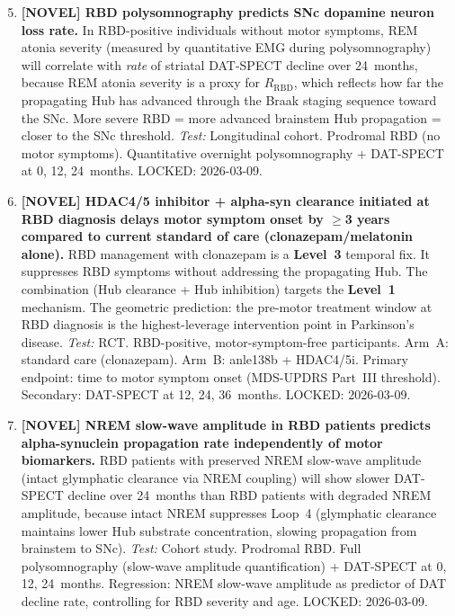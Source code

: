 \documentclass[12pt,a4paper]{article}
\newcommand{\Lev}[1]{\textbf{Level~#1}}
\begin{document}
\begin{enumerate}[leftmargin=2em, itemsep=0.6em, label=\textbf{P\arabic*.}]
  \setcounter{enumi}{4}

  \item \textbf{[NOVEL] RBD polysomnography predicts SNc dopamine neuron
  loss rate.} In RBD-positive individuals without motor symptoms, REM
  atonia severity (measured by quantitative EMG during polysomnography)
  will correlate with \emph{rate} of striatal DAT-SPECT decline over
  24~months, because REM atonia severity is a proxy for $R_{\mathrm{RBD}}$,
  which reflects how far the propagating Hub has advanced through the
  Braak staging sequence toward the SNc. More severe RBD = more advanced
  brainstem Hub propagation = closer to the SNc threshold.
  \textit{Test:} Longitudinal cohort. Prodromal RBD (no motor symptoms).
  Quantitative overnight polysomnography + DAT-SPECT at 0, 12, 24~months.
  LOCKED: 2026-03-09.

  \item \textbf{[NOVEL] HDAC4/5 inhibitor + alpha-syn clearance initiated
  at RBD diagnosis delays motor symptom onset by $\geq$3 years compared
  to current standard of care (clonazepam/melatonin alone).} RBD management
  with clonazepam is a \Lev{3} temporal fix. It suppresses RBD symptoms
  without addressing the propagating Hub. The combination (Hub clearance
  + Hub inhibition) targets the \Lev{1} mechanism. The geometric prediction:
  the pre-motor treatment window at RBD diagnosis is the highest-leverage
  intervention point in Parkinson's disease.
  \textit{Test:} RCT. RBD-positive, motor-symptom-free participants.
  Arm~A: standard care (clonazepam). Arm~B: anle138b + HDAC4/5i.
  Primary endpoint: time to motor symptom onset (MDS-UPDRS Part~III
  threshold). Secondary: DAT-SPECT at 12, 24, 36~months.
  LOCKED: 2026-03-09.

  \item \textbf{[NOVEL] NREM slow-wave amplitude in RBD patients predicts
  alpha-synuclein propagation rate independently of motor biomarkers.}
  RBD patients with preserved NREM slow-wave amplitude (intact glymphatic
  clearance via NREM coupling) will show slower DAT-SPECT decline over
  24~months than RBD patients with degraded NREM amplitude, because intact
  NREM suppresses Loop~4 (glymphatic clearance maintains lower Hub substrate
  concentration, slowing propagation from brainstem to SNc).
  \textit{Test:} Cohort study. Prodromal RBD. Full polysomnography (slow-wave
  amplitude quantification) + DAT-SPECT at 0, 12, 24~months. Regression:
  NREM slow-wave amplitude as predictor of DAT decline rate,
  controlling for RBD severity and age.
  LOCKED: 2026-03-09.


\end{enumerate}
\end{document}
